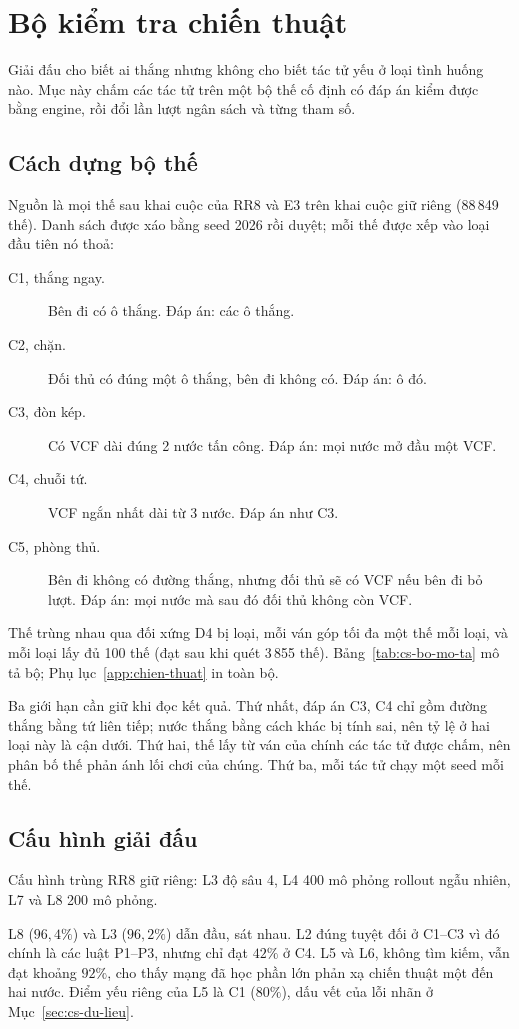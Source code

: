 \section{Bộ kiểm tra chiến thuật}
\label{sec:cs-chien-thuat}
Giải đấu cho biết ai thắng nhưng không cho biết tác tử yếu ở loại tình huống nào. Mục này chấm các tác tử trên một bộ
thế cố định có đáp án kiểm được bằng engine, rồi đổi lần lượt ngân sách và từng tham số.

\subsection{Cách dựng bộ thế}
Nguồn là mọi thế sau khai cuộc của RR8 và E3 trên khai cuộc giữ riêng (88\,849 thế). Danh sách được xáo bằng seed 2026
rồi duyệt; mỗi thế được xếp vào loại đầu tiên nó thoả:
\begin{description}
  \item[C1, thắng ngay.] Bên đi có ô thắng. Đáp án: các ô thắng.
  \item[C2, chặn.] Đối thủ có đúng một ô thắng, bên đi không có. Đáp án: ô đó.
  \item[C3, đòn kép.] Có VCF dài đúng 2 nước tấn công. Đáp án: mọi nước mở đầu một VCF.
  \item[C4, chuỗi tứ.] VCF ngắn nhất dài từ 3 nước. Đáp án như C3.
  \item[C5, phòng thủ.] Bên đi không có đường thắng, nhưng đối thủ sẽ có VCF nếu bên đi bỏ lượt. Đáp án: mọi nước mà
  sau đó đối thủ không còn VCF.
\end{description}
Thế trùng nhau qua đối xứng D4 bị loại, mỗi ván góp tối đa một thế mỗi loại, và mỗi loại lấy đủ 100 thế (đạt sau khi
quét 3\,855 thế). Bảng~\ref{tab:cs-bo-mo-ta} mô tả bộ; Phụ lục~\ref{app:chien-thuat} in toàn bộ.


Ba giới hạn cần giữ khi đọc kết quả. Thứ nhất, đáp án C3, C4 chỉ gồm đường thắng bằng tứ liên tiếp; nước thắng bằng
cách khác bị tính sai, nên tỷ lệ ở hai loại này là cận dưới. Thứ hai, thế lấy từ ván của chính các tác tử được chấm,
nên phân bố thế phản ánh lối chơi của chúng. Thứ ba, mỗi tác tử chạy một seed mỗi thế.

\subsection{Cấu hình giải đấu}
Cấu hình trùng RR8 giữ riêng: L3 độ sâu 4, L4 400 mô phỏng rollout ngẫu nhiên, L7 và L8 200 mô phỏng.

L8 ($96{,}4\%$) và L3 ($96{,}2\%$) dẫn đầu, sát nhau. L2 đúng tuyệt đối ở C1--C3 vì đó chính là các luật P1--P3, nhưng chỉ
đạt $42\%$ ở C4. L5 và L6, không tìm kiếm, vẫn đạt khoảng $92\%$, cho thấy mạng đã học phần lớn phản xạ chiến thuật
một đến hai nước. Điểm yếu riêng của L5 là C1 ($80\%$), dấu vết của lỗi nhãn ở Mục~\ref{sec:cs-du-lieu}.

